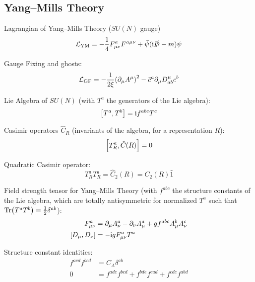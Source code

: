 	\subsection{Yang--Mills Theory}
		Lagrangian of Yang--Mills Theory ($SU(N)$ gauge)
		\begin{equation}
			\mathcal{L}_\text{YM} = -\frac{1}{4} F^a_{\mu\nu} F^{a\mu\nu} + \bar{\psi}(\mathrm{i}\slashed{D}-m)\psi
		\end{equation}

		\noindent
		Gauge Fixing and ghosts:
		\begin{equation}
			\mathcal{L}_\text{GF} = -\frac{1}{2\xi} \qty(\partial_\mu A^\mu)^2 - \bar{c}^a \partial_\mu D^\mu_{ab} c^b
		\end{equation}

		\noindent
		Lie Algebra of $SU(N)$ (with $T^a$ the generators of the Lie algebra):
		\begin{equation}
			\comm{T^a}{T^b} = \i f^{abc} T^c
		\end{equation}

		\noindent
		Casimir operators $\hat{C}_R$ (invariants of the algebra, for a representation $R$):
		\begin{equation}
			\comm{T_R^a}{\hat{C}(R)} = 0
		\end{equation}

		\noindent
		Quadratic Casimir operator:
		\begin{equation}
			T^a_R T^a_R = \hat{C}_2(R) = C_2(R) \hat{1}
		\end{equation}

		\noindent
		Field strength tensor for Yang--Mills Theory (with $f^{abc}$ the structure constants of the Lie algebra, which are totally antisymmetric for normalized $T^a$ such that $\Tr(T^a T^b) = \frac{1}{2} \delta^{ab}$):
		\begin{equation}
			\begin{aligned}
				F^a_{\mu\nu} &= \partial_\mu A^a_\nu - \partial_\nu A^a_\mu + g f^{abc} A^b_\mu A^c_\nu \\
				\comm{D_\mu}{D_\nu} &= -\i g F_{\mu\nu}^a T^a
			\end{aligned}
		\end{equation}

		\noindent
		Structure constant identities:
		\begin{align}
			f^{acd} f^{bcd} &= C_A \delta^{ab} \\
			0 &= f^{ade} f^{bcd} + f^{bde} f^{cad} + f^{cde} f^{abd}
		\end{align}

